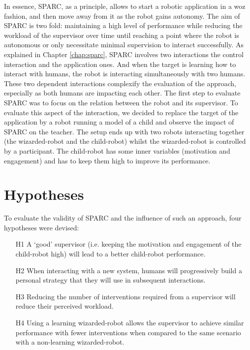 In essence, SPARC, as a principle, allows to start a robotic application in a \gls{woz} fashion, and then move away from it as the robot gains autonomy. The aim of SPARC is two fold: maintaining a high level of performance while reducing the workload of the supervisor over time until reaching a point where the robot is autonomous or only necessitate minimal supervision to interact successfully. As explained in Chapter \ref{chap:sparc}, SPARC involves two interactions the control interaction and the application ones. And when the target is learning how to interact with humans, the robot is interacting simultaneously with two humans. These two dependent interactions complexify the evaluation of the approach, especially as both humans are impacting each other. The first step to evaluate SPARC was to focus on the relation between the robot and its supervisor. To evaluate this aspect of the interaction, we decided to replace the target of the application by a robot running a model of a child and observe the impact of SPARC on the teacher. The setup ends up with two robots interacting together (the wizarded-robot and the child-robot) whilst the wizarded-robot is controlled by a participant. The child-robot has some inner variables (motivation and engagement) and has to keep them high to improve its performance.

\section{Hypotheses}

To evaluate the validity of SPARC and the influence of such an approach, four hypotheses were devised:
\begin{enumerate}
	\item [H1] A `good' supervisor (i.e. keeping the motivation and engagement of the child-robot high) will lead to a better child-robot performance.
	\item [H2] When interacting with a new system, humans will progressively build a personal strategy that they will use in subsequent interactions.
	\item [H3] Reducing the number of interventions required from a supervisor will reduce their perceived workload.
	\item [H4] Using a learning wizarded-robot allows the supervisor to achieve similar performance with fewer interventions when compared to the same scenario with a non-learning wizarded-robot.
\end{enumerate}

